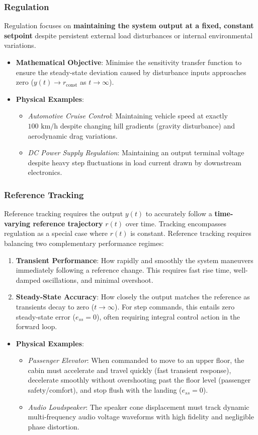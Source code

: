 \documentclass[12pt,onecolumn,twoside ]{article}
\begin{document}
	\subsubsection{Regulation}
	Regulation focuses on \textbf{maintaining the system output at a fixed, constant setpoint} despite persistent external load disturbances or internal environmental variations.
	\begin{itemize}
		\item
		\textbf{Mathematical Objective}: Minimise the sensitivity transfer function to ensure the steady-state deviation caused by disturbance inputs approaches zero ($y(t) \to r_{\text{const}}$ as $t \to \infty$).
		\item
		\textbf{Physical Examples}:
		\begin{itemize}
			\item
			\textit{Automotive Cruise Control}: Maintaining vehicle speed at exactly $100\text{ km/h}$ despite changing hill gradients (gravity disturbance) and aerodynamic drag variations.
			\item
			\textit{DC Power Supply Regulation}: Maintaining an output terminal voltage despite heavy step fluctuations in load current drawn by downstream electronics.
		\end{itemize}
	\end{itemize}
	\subsubsection{Reference Tracking}
	Reference tracking requires the output $y(t)$ to accurately follow a \textbf{time-varying reference trajectory} $r(t)$ over time. Tracking encompasses regulation as a special case where $r(t)$ is constant. Reference tracking requires balancing two complementary performance regimes:
	\begin{enumerate}
		\item
		\textbf{Transient Performance}: How rapidly and smoothly the system maneuvers immediately following a reference change. This requires fast rise time, well-damped oscillations, and minimal overshoot.
		\item
		\textbf{Steady-State Accuracy}: How closely the output matches the reference as transients decay to zero ($t \to \infty$). For step commands, this entails zero steady-state error ($e_{ss} = 0$), often requiring integral control action in the forward loop.
	\end{enumerate}
	\begin{itemize}
		\item
		\textbf{Physical Examples}:
		\begin{itemize}
			\item
			\textit{Passenger Elevator}: When commanded to move to an upper floor, the cabin must accelerate and travel quickly (fast transient response), decelerate smoothly without overshooting past the floor level (passenger safety/comfort), and stop flush with the landing ($e_{ss} = 0$).
			\item
			\textit{Audio Loudspeaker}: The speaker cone displacement must track dynamic multi-frequency audio voltage waveforms with high fidelity and negligible phase distortion.
		\end{itemize}
	\end{itemize}
\end{document}
